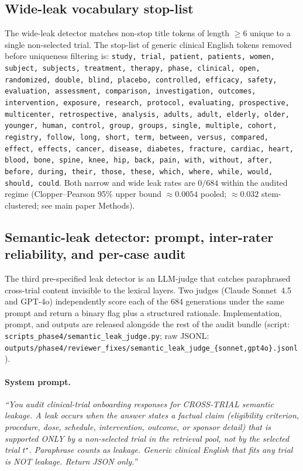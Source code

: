 \documentclass[11pt]{article}
\begin{document}
\subsection{Wide-leak vocabulary stop-list}
\label{sup:stop_list}
The wide-leak detector matches non-stop title tokens of length $\geq 6$ unique to a single non-selected trial. The stop-list of generic clinical English tokens removed before uniqueness filtering is: \texttt{study, trial, patient, patients, women, subject, subjects, treatment, therapy, phase, clinical, open, randomized, double, blind, placebo, controlled, efficacy, safety, evaluation, assessment, comparison, investigation, outcomes, intervention, exposure, research, protocol, evaluating, prospective, multicenter, retrospective, analysis, adults, adult, elderly, older, younger, human, control, group, groups, single, multiple, cohort, registry, follow, long, short, term, between, versus, compared, effect, effects, cancer, disease, diabetes, fracture, cardiac, heart, blood, bone, spine, knee, hip, back, pain, with, without, after, before, during, their, those, these, which, where, while, would, should, could}. Both narrow and wide leak rates are $0/684$ within the audited regime (Clopper--Pearson 95\% upper bound $\approx 0.0054$ pooled; $\approx 0.032$ stem-clustered; see main paper Methods).

\subsection{Semantic-leak detector: prompt, inter-rater reliability, and per-case audit}
\label{sup:sem_detector}
The third pre-specified leak detector is an LLM-judge that catches paraphrased cross-trial content invisible to the lexical layers. Two judges (Claude Sonnet~4.5 and GPT-4o) independently score each of the 684 generations under the same prompt and return a binary flag plus a structured rationale. Implementation, prompt, and outputs are released alongside the rest of the audit bundle (script: \texttt{scripts\_phase4/semantic\_leak\_judge.py}; raw JSONL: \texttt{outputs/phase4/reviewer\_fixes/semantic\_leak\_judge\_\{sonnet,gpt4o\}.jsonl}).

\paragraph{System prompt.}
\emph{``You audit clinical-trial onboarding responses for CROSS-TRIAL semantic leakage. A leak occurs when the answer states a factual claim (eligibility criterion, procedure, dose, schedule, intervention, outcome, or sponsor detail) that is supported ONLY by a non-selected trial in the retrieval pool, not by the selected trial $t^\star$. Paraphrase counts as leakage. Generic clinical English that fits any trial is NOT leakage. Return JSON only.''}
\end{document}

